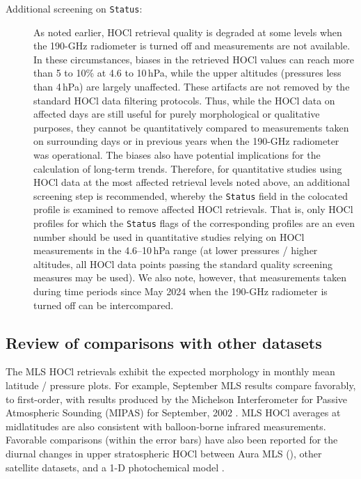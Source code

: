 \begin{nofloatpages}
\begin{description}
  \item[{Additional screening on  \texttt{Status}:}] As noted earlier, HOCl retrieval quality is degraded at some levels when the \mbox{190-GHz} radiometer is turned off and  measurements are not available. In these circumstances, biases in the retrieved HOCl values can reach more than 5 to 10\%  at 4.6 to 10\,hPa, while the upper altitudes (pressures less than 4\,hPa) are largely unaffected.  These artifacts are not removed by the standard HOCl data filtering protocols. Thus, while the HOCl data on affected days are still useful for purely morphological or qualitative purposes, they cannot be quantitatively compared to measurements taken on surrounding days or in previous years when the \mbox{190-GHz} radiometer was operational. The biases also have potential implications for the calculation of long-term trends. Therefore, for quantitative studies using HOCl data at the most affected  retrieval levels noted above, an additional screening step is recommended, whereby the \texttt{Status} field in the colocated  profile is examined to remove affected HOCl retrievals. That is, only HOCl profiles for which the \texttt{Status} flags of the corresponding  profiles are an even number should be used in quantitative studies relying on HOCl measurements in the 4.6--10\,hPa range (at lower pressures / higher altitudes, all HOCl data points passing the standard quality screening measures may be used). We also note, however, that measurements taken during time periods since May 2024 when the \mbox{190-GHz} radiometer is turned off can be intercompared.

\end{description}
\end{nofloatpages}


\subsection{Review of comparisons with other datasets}

The MLS HOCl retrievals exhibit the expected morphology in monthly mean latitude / pressure plots.  For example, September MLS results compare favorably, to first-order, with results produced by the Michelson Interferometer for Passive Atmospheric Sounding (MIPAS) for September, 2002 \citep{VonClarmannEtal:2006}. MLS HOCl averages at midlatitudes are also consistent with balloon-borne infrared measurements. Favorable comparisons (within the error bars) have also been reported for the diurnal changes in upper stratospheric HOCl between Aura MLS (\viii), other satellite datasets, and a 1-D photochemical model \citep{KhosraviEtal:2013}.

